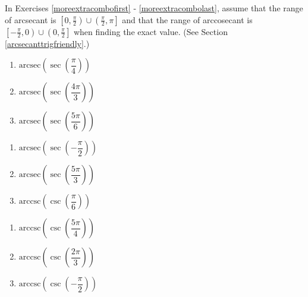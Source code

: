 \documentclass{ximera}
\begin{document}
In Exercises \ref{moreextracombofirst} - \ref{moreextracombolast}, assume that the range of arcsecant is $\left[0, \frac{\pi}{2} \right) \cup \left( \frac{\pi}{2}, \pi \right]$ and that the range of arccosecant is $\left[ -\frac{\pi}{2}, 0 \right)  \cup \left(0, \frac{\pi}{2} \right]$ when finding the exact value. (See Section \ref{arcsecanttrigfriendly}.)


\begin{multicols}{3}

\begin{enumerate}

\setcounter{enumi}{\value{HW}}

\item  $\text{arcsec}\left(\sec\left(\dfrac{\pi}{4}\right) \right)$  \label{moreextracombofirst}
\item  $\text{arcsec}\left(\sec\left(\dfrac{4\pi}{3}\right) \right)$
\item  $\text{arcsec}\left(\sec\left( \dfrac{5\pi}{6} \right) \right)$

\setcounter{HW}{\value{enumi}}

\end{enumerate}

\end{multicols}

\begin{multicols}{3}

\begin{enumerate}

\setcounter{enumi}{\value{HW}}

\item  $\text{arcsec}\left(\sec\left(-\dfrac{\pi}{2} \right) \right)$ 
\item  $\text{arcsec}\left(\sec\left(\dfrac{5\pi}{3}\right) \right)$
\item  $\text{arccsc}\left(\csc\left(\dfrac{\pi}{6}\right) \right)$ 

\setcounter{HW}{\value{enumi}}

\end{enumerate}

\end{multicols}

\begin{multicols}{3}

\begin{enumerate}

\setcounter{enumi}{\value{HW}}

\item  $\text{arccsc}\left(\csc\left(\dfrac{5\pi}{4}\right) \right)$
\item  $\text{arccsc}\left(\csc\left( \dfrac{2\pi}{3} \right) \right)$
\item  $\text{arccsc}\left(\csc\left(-\dfrac{\pi}{2} \right) \right)$ 

\setcounter{HW}{\value{enumi}}

\end{enumerate}

\end{multicols}
\end{document}
